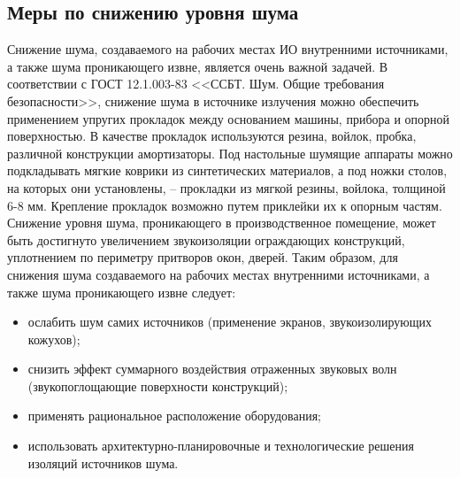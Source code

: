\documentclass[utf8,usehyperref,12pt]{G7-32}
\begin{document}
\subsection{Меры по снижению уровня шума}
Снижение шума, создаваемого на рабочих местах ИО внутренними источниками, а также шума проникающего извне, является очень важной задачей. В соответствии с ГОСТ 12.1.003-83 <<ССБТ. Шум. Общие требования безопасности>>\cite{gost_12.1.003-83}, снижение шума в источнике излучения можно обеспечить применением упругих прокладок между основанием машины, прибора и опорной поверхностью. В качестве прокладок используются резина, войлок, пробка, различной конструкции амортизаторы. Под настольные шумящие аппараты можно подкладывать мягкие коврики из синтетических материалов, а под ножки столов, на которых они установлены, – прокладки из мягкой резины, войлока, толщиной 6-8 мм. Крепление прокладок возможно путем приклейки их к опорным частям. 
Снижение уровня шума, проникающего в производственное помещение, может быть достигнуто увеличением звукоизоляции ограждающих конструкций, уплотнением по периметру притворов окон, дверей. 
Таким образом, для снижения шума создаваемого на рабочих местах внутренними источниками, а также шума проникающего извне следует:
\begin{itemize}
 \item ослабить шум самих источников (применение экранов, звукоизолирующих кожухов);
 \item снизить эффект суммарного воздействия отраженных звуковых волн (звукопоглощающие поверхности конструкций);
 \item применять рациональное расположение оборудования;
 \item использовать архитектурно-планировочные и технологические решения изоляций источников шума.
\end{itemize}
\end{document}
